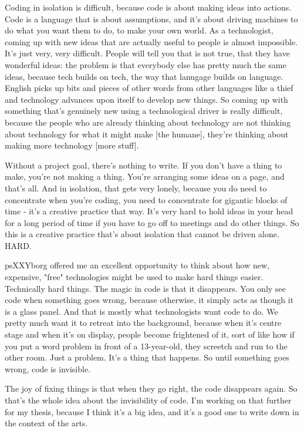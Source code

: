 Coding in isolation is difficult, because code is about making ideas into actions. Code is a language that is about assumptions, and it's about driving machines to do what you want them to do, to make your own world. As a technologist, coming up with new ideas that are actually useful to people is almost impossible. It's just very, very difficult. People will tell you that is not true, that they have wonderful ideas: the problem is that everybody else has pretty much the same ideas, because tech builds on tech, the way that lanugage builds on language. English picks up bits and pieces of other words from other languages like a thief and technology advances upon itself to develop new things. So coming up with something that's genuinely new using a technological driver is really difficult, because the people who are already thinking about technology are not thinking about technology for what it might make [the humane], they're thinking about making more technology [more stuff]. 

Without a project goal, there's nothing to write. If you don't have a thing to make, you're not making a thing. You're arranging some ideas on a page, and that's all. And in isolation, that gets very lonely, because you do need to concentrate when you're coding, you need to concentrate for gigantic blocks of time - it's a creative practice that way. It's very hard to hold ideas in your head for a long period of time if you have to go off to meetings and do other things. So this is a creative practice that's about isolation that cannot be driven alone. HARD.

psXXYborg offered me an excellent opportunity to think about how new, expensive, "free" technologies might be used to make hard things easier. Technically hard things. The magic in code is that it disappears. You only see code when something goes wrong, because otherwise, it simply acts as though it is a glass panel. And that is mostly what technologists want code to do. We pretty much want it to retreat into the background, because when it's centre stage and when it's on display, people become frightened of it, sort of like how if you put a word problem in front of a 13-year-old, they screetch and run to the other room. Just a problem. It's a thing that happens. So until something goes wrong, code is invisible.

The joy of fixing things is that when they go right, the code disappears again. So that's the whole idea about the invisibility of code. I'm working on that further for my thesis, because I think it's a big idea, and it's a good one to write down in the context of the arts.

